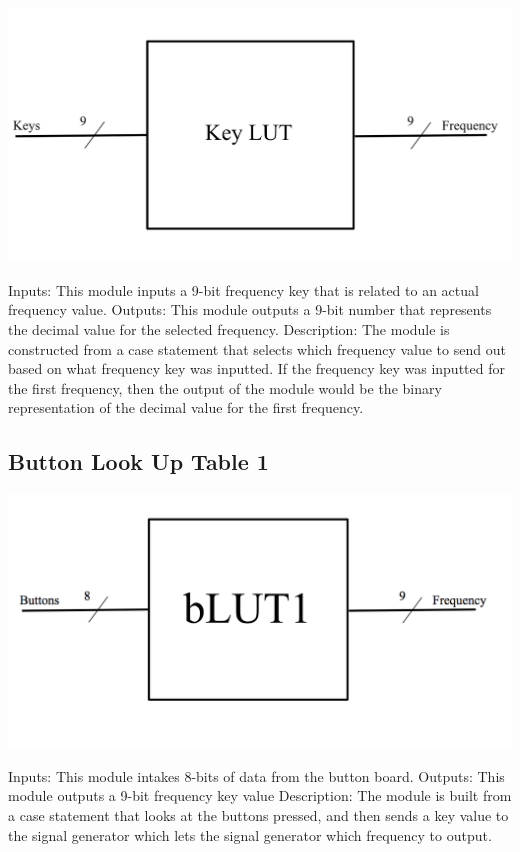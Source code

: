 \documentclass[a4paper]{article}
\begin{document}
    \includegraphics[width=6 in]{./Images/jackPictures/keyLUT.png}


Inputs: This module inputs a 9-bit frequency key that is related to an actual frequency value.
\newline\newline
Outputs: This module outputs a 9-bit number that represents the decimal value for the selected frequency.
\newline\newline
Description: The module is constructed from a case statement that selects which frequency value to send out based on what frequency key was inputted. If the frequency key was inputted for the first frequency, then the output of the module would be the binary representation of the decimal value for the first frequency.


\subsection{Button Look Up Table 1}

    \includegraphics[width=6 in]{./Images/jackPictures/blut1.png}


Inputs: This module intakes 8-bits of data from the button board.
\newline\newline
Outputs: This module outputs a 9-bit frequency key value
\newline\newline
Description: The module is built from a case statement that looks at the buttons pressed, and then sends a key value to the signal generator which lets the signal generator which frequency to output.
\end{document}
